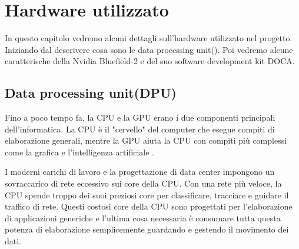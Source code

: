 \documentclass[binding=0.6cm]{sapthesis}
\theoremstyle{definition}
\begin{document}
\chapter{Hardware utilizzato}
In questo capitolo vedremo alcuni dettagli sull'hardware utilizzato nel progetto.
Iniziando dal descrivere cosa sono le data processing unit(\cite{What Is a DPU}).
Poi vedremo alcune caratterische della Nvidia Bluefield-2 e del suo software development kit DOCA.
\section{Data processing unit(DPU)}




Fino a poco tempo fa, la CPU e la GPU erano i due componenti principali dell'informatica.
La CPU è il "cervello" del computer che esegue compiti di elaborazione generali, 
mentre la GPU aiuta la CPU con compiti più complessi come la grafica e l'intelligenza artificiale .

I moderni carichi di lavoro 
e la progettazione di data center impongono un sovraccarico di rete eccessivo sui core della CPU. 
Con una rete più veloce, la CPU spende troppo dei suoi preziosi 
core per classificare, tracciare e guidare il traffico di rete. Questi costosi core della CPU sono
progettati  per l'elaborazione di applicazioni generiche e l'ultima cosa necessaria è consumare 
tutta questa potenza di elaborazione semplicemente guardando e gestendo il movimento dei dati.
\end{document}
